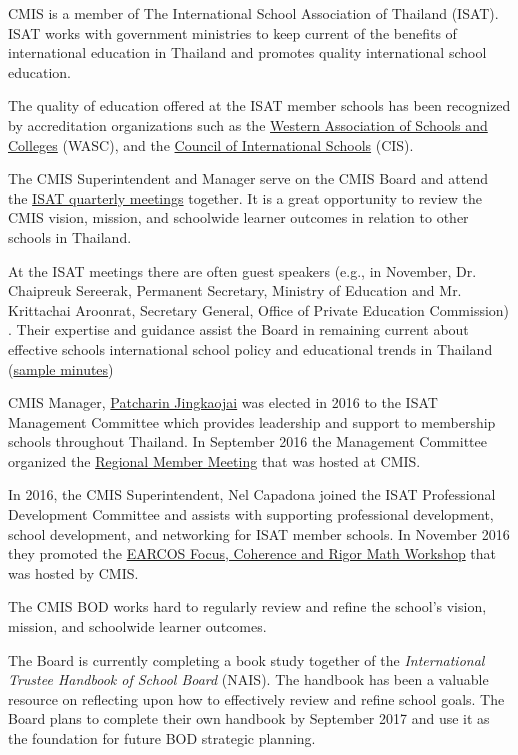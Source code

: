 \begin{findings}
CMIS is a member of The International School Association of Thailand (ISAT). ISAT works with government ministries to keep current of the benefits of international education in Thailand and promotes quality international school education.

The quality of education offered at the ISAT member schools has been recognized by accreditation organizations such as the \href{https://en.wikipedia.org/wiki/Western_Association_of_Schools_and_Colleges}{Western Association of Schools and Colleges} (WASC), and the \href{https://en.wikipedia.org/w/index.php?title=Council_of_International_Schools&action=edit&redlink=1}{Council of International Schools} (CIS).

The CMIS Superintendent and Manager serve on the CMIS Board and attend the \href{https://drive.google.com/a/cmis.ac.th/file/d/0Bwny3HLdIIS7LUtqTlR2REhsLVBkWHVib3k3V1hsWVFtUzIw/view?usp=sharing}{ISAT quarterly meetings} together. It is a great opportunity to review the CMIS vision, mission, and schoolwide learner outcomes in relation to other schools in Thailand. 

At the ISAT meetings there are often guest speakers (e.g., in November, Dr. Chaipreuk Sereerak, Permanent Secretary, Ministry of Education and Mr. Krittachai Aroonrat, Secretary General, Office of Private Education Commission) . Their expertise and guidance assist the Board in remaining current about effective schools international school policy and educational trends in Thailand (\href{http://www.isat.or.th/members/announcement-updates/minutes-isat-general-member-meeting-22016}{sample minutes})

CMIS Manager, \href{https://drive.google.com/a/cmis.ac.th/file/d/0Bwo-i12FeO0rY1V1SGtuSzJBd1U/view?usp=sharing}{Patcharin Jingkaojai} was elected in 2016 to the ISAT Management Committee which provides leadership and support to membership schools throughout Thailand. In September 2016 the Management Committee organized the \href{https://drive.google.com/a/cmis.ac.th/file/d/0Bwo-i12FeO0rQ0JOZ09JVTNEUTA/view?usp=sharing}{Regional Member Meeting} that was hosted at CMIS. 

In 2016, the CMIS Superintendent, Nel Capadona joined the ISAT Professional Development Committee and assists with supporting professional development, school development, and networking for ISAT member schools. In November 2016 they promoted the \href{https://drive.google.com/a/cmis.ac.th/file/d/0ByVFfrm0zfolSXFEZFJVN1VOaTQ/view?usp=sharing}{EARCOS Focus, Coherence and Rigor Math Workshop} that was hosted by CMIS.


The CMIS BOD works hard to regularly review and refine the school’s vision, mission, and schoolwide learner outcomes. 

The Board is currently completing a book study together of the \textit{International Trustee Handbook of School Board} (NAIS). The handbook has been a valuable resource on reflecting upon how to effectively review and refine school goals. The Board plans to complete their own handbook by September 2017 and use it as the foundation for future BOD strategic planning.

\end{findings}


